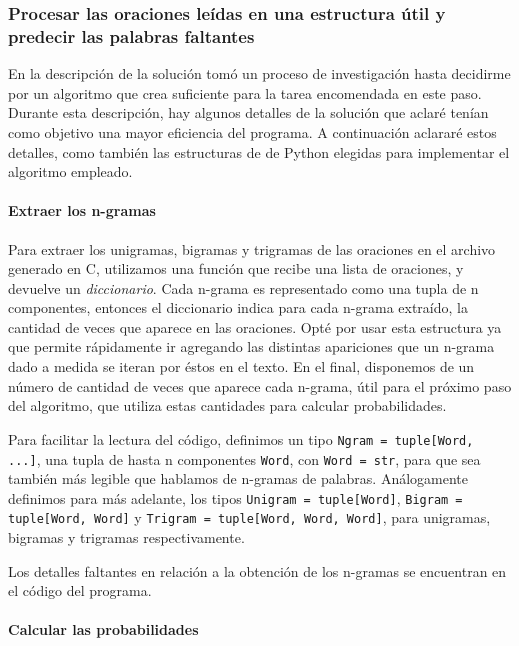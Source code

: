 \documentclass[a4paper]{article}
\begin{document}
\subsubsection{Procesar las oraciones leídas en una estructura útil y predecir las palabras faltantes}

En la descripción de la solución tomó un proceso de investigación hasta decidirme por un algoritmo que crea suficiente para la tarea encomendada en este paso. Durante esta descripción, hay algunos detalles de la solución que aclaré tenían como objetivo una mayor eficiencia del programa. A continuación aclararé estos detalles, como también las estructuras de de Python elegidas para implementar el algoritmo empleado.

\paragraph{Extraer los n-gramas}

Para extraer los unigramas, bigramas y trigramas de las oraciones en el archivo generado en C, utilizamos una función que recibe una lista de oraciones, y devuelve un \textit{diccionario}. Cada n-grama es representado como una tupla de n componentes, entonces el diccionario indica para cada n-grama extraído, la cantidad de veces que aparece en las oraciones. Opté por usar esta estructura ya que permite rápidamente ir agregando las distintas apariciones que un n-grama dado a medida se iteran por éstos en el texto. En el final, disponemos de un número de cantidad de veces que aparece cada n-grama, útil para el próximo paso del algoritmo, que utiliza estas cantidades para calcular probabilidades.

Para facilitar la lectura del código, definimos un tipo \texttt{Ngram = tuple[Word, ...]}, una tupla de hasta n componentes \texttt{Word}, con \texttt{Word = str}, para que sea también más legible que hablamos de n-gramas de palabras. Análogamente definimos para más adelante, los tipos \texttt{Unigram = tuple[Word]}, \texttt{Bigram = tuple[Word, Word]} y \texttt{Trigram = tuple[Word, Word, Word]}, para unigramas, bigramas y trigramas respectivamente.

Los detalles faltantes en relación a la obtención de los n-gramas se encuentran en el código del programa.

\paragraph{Calcular las probabilidades}
\end{document}
